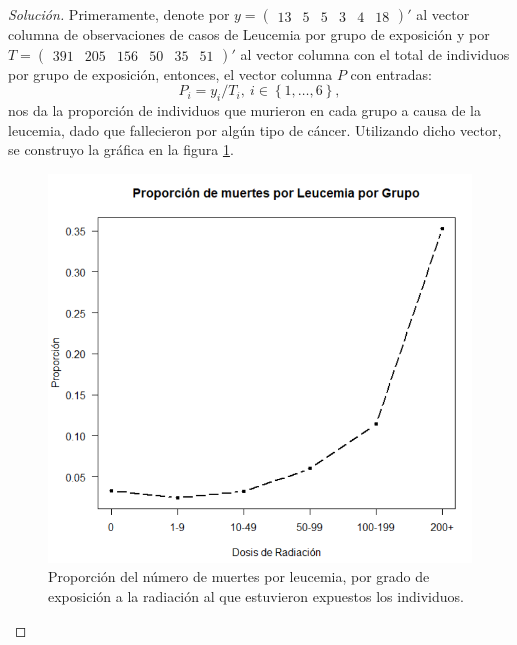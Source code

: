 \documentclass[10.5pt,notitlepage]{article}
\newenvironment{solucion}
  {\begin{proof}[Solución]}
  {\end{proof}}
\newcommand{\kis}[1]{\left\{ #1 \right\}}
\theoremstyle{plain}
\begin{document}
\begin{solucion}
Primeramente, denote por \(y = \begin{pmatrix}13 &5&5&3&4&18 \end{pmatrix}'\) al vector columna de observaciones de casos de Leucemia por grupo de exposición y por \(T = \begin{pmatrix} 391 &205 &156& 50 &35& 51 \end{pmatrix}'\) al vector columna con el total de individuos por grupo de exposición, entonces, el vector columna \(P\) con entradas:
\begin{equation*}
    P_i = y_i / T_i, \ i \in \kis{1, \hdots, 6},
\end{equation*}
nos da la proporción de individuos que murieron en cada grupo a causa de la leucemia, dado que fallecieron por algún tipo de cáncer. Utilizando dicho vector, se construyo la gráfica en la figura \ref{figIm1}.
\begin{figure}[htb]
    \centering
    \includegraphics[scale= 0.7]{Im1Ej4.png}
    \caption{Proporción del número de muertes por leucemia, por grado de exposición a la radiación al que estuvieron expuestos los individuos.}
    \label{figIm1}
\end{figure}

\end{solucion}
\end{document}
